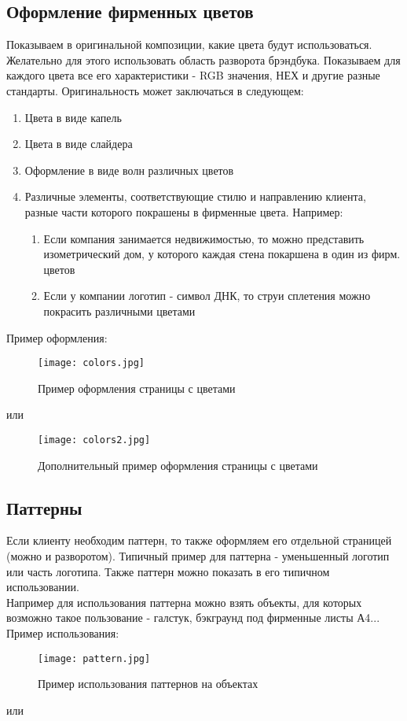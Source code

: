 \documentclass[DIV=calc, paper=a4, fontsize=11pt]{scrartcl} %
\begin{document}
\subsection{Оформление фирменных цветов}
Показываем в оригинальной композиции, какие цвета будут использоваться. Желательно для этого использовать область разворота брэндбука. Показываем для каждого цвета все его характеристики - RGB значения, НЕХ и другие разные стандарты. Оригинальность может заключаться в следующем:
    \begin{enumerate}
        \item Цвета в виде капель
        \item Цвета в виде слайдера
        \item Оформление в виде волн различных цветов
        \item Различные элементы, соответствующие стилю и направлению клиента, разные части которого покрашены в фирменные цвета. Например:
            \begin{enumerate}
                \item Если компания занимается недвижимостью, то можно представить изометрический дом, у которого каждая стена покаршена в один из фирм. цветов
                \item Если у компании логотип - символ ДНК, то струи сплетения можно покрасить различными цветами
            \end{enumerate}
    \end{enumerate}
Пример оформления:
            \begin{figure}[H]
            \centering
            \texttt{[image: colors.jpg]}
            \caption{Пример оформления страницы с цветами \label{fig:colors.jpg}}
            \end{figure}
            
или
            \begin{figure}[H]
            \centering
            \texttt{[image: colors2.jpg]}
            \caption{Дополнительный пример оформления страницы с цветами\label{fig:colors2.jpg}}
            \end{figure}
    
\subsection{Паттерны}
Если клиенту необходим паттерн, то также оформляем его отдельной страницей (можно и разворотом). Типичный пример для паттерна - уменьшенный логотип или часть логотипа. Также паттерн можно показать в его типичном использовании.
\\[0.5cm]
Например для использования паттерна можно взять объекты, для которых возможно такое пользование - галстук, бэкграунд под фирменные листы А4...
\\[0.5cm]
Пример использования:
            \begin{figure}[H]
            \centering
            \texttt{[image: pattern.jpg]}
            \caption{Пример использования паттернов на объектах \label{fig:pattern.jpg}}
            \end{figure}
или
\end{document}

